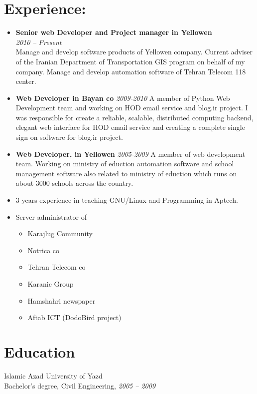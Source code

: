 \documentclass[a4paper,11pt]{article}
\begin{document}
\section*{Experience:}
\begin{itemize}
\item \textbf{Senior web Developer and Project manager in Yellowen}\\
  \emph{2010 – Present}\\
  Manage and develop software products of Yellowen company. Current adviser of
  the Iranian Department of Transportation GIS program on behalf of my company.
  Manage and develop automation software of Tehran Telecom 118 center.

\item \textbf{Web Developer in Bayan co}
  \emph{2009-2010}
  A member of Python Web Development team and working on HOD email service and
  blog.ir project. I was responsible for create a reliable, scalable, distributed
  computing backend, elegant web interface for HOD email service and creating a
  complete single sign on software for blog.ir project.

\item \textbf{Web Developer, in Yellowen}
  \emph{2005-2009}
  A member of web development team. Working on ministry of eduction automation
  software and school management software also related to ministry of eduction
  which runs on about 3000 schools across the country.

\item 3 years experience in teaching GNU/Linux and Programming in Aptech.
\item Server administrator of
  \begin{itemize}
  \item Karajlug Community
  \item Notrica co
  \item Tehran Telecom co
  \item Karanic Group
  \item Hamshahri newspaper
  \item Aftab ICT (DodoBird project)
  \end{itemize}
\end{itemize}

\section*{Education}
Islamic Azad University of Yazd\\
Bachelor's degree, Civil Engineering, \emph{2005 – 2009}\\
\end{document}

